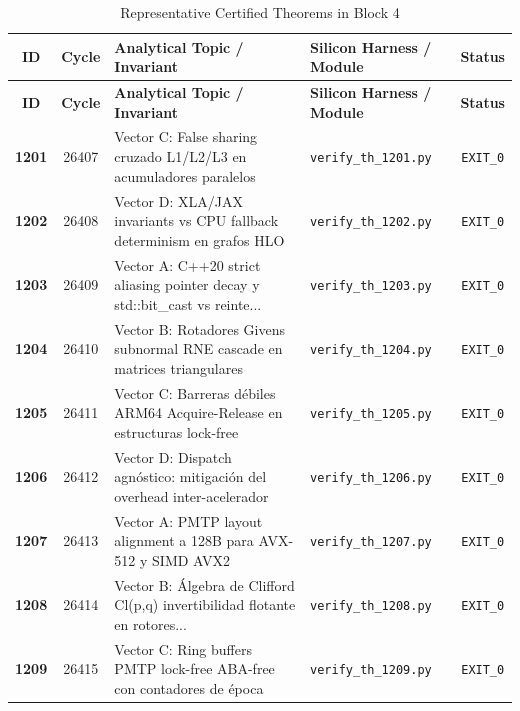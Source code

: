 \documentclass[journal,10pt,compsoc]{IEEEtran}
\theoremstyle{plain}
\theoremstyle{definition}
\begin{document}
\begin{center}
\small
\begin{longtable}{ccp{6.8cm}p{5.2cm}c}
\caption{Representative Certified Theorems in Block 4} \label{tab:theorems_block_4} \\
\toprule
\textbf{ID} & \textbf{Cycle} & \textbf{Analytical Topic / Invariant} & \textbf{Silicon Harness / Module} & \textbf{Status} \\
\midrule
\endfirsthead
\toprule
\textbf{ID} & \textbf{Cycle} & \textbf{Analytical Topic / Invariant} & \textbf{Silicon Harness / Module} & \textbf{Status} \\
\midrule
\endhead
\bottomrule
\endfoot
\textbf{1201} & 26407 & Vector C: False sharing cruzado L1/L2/L3 en acumuladores paralelos \label{thm:polydim_1201} & \texttt{verify\_th\_1201.py} & \texttt{EXIT\_0} \\
\textbf{1202} & 26408 & Vector D: XLA/JAX invariants vs CPU fallback determinism en grafos HLO \label{thm:polydim_1202} & \texttt{verify\_th\_1202.py} & \texttt{EXIT\_0} \\
\textbf{1203} & 26409 & Vector A: C++20 strict aliasing pointer decay y std::bit\_cast vs reinte... \label{thm:polydim_1203} & \texttt{verify\_th\_1203.py} & \texttt{EXIT\_0} \\
\textbf{1204} & 26410 & Vector B: Rotadores Givens subnormal RNE cascade en matrices triangulares \label{thm:polydim_1204} & \texttt{verify\_th\_1204.py} & \texttt{EXIT\_0} \\
\textbf{1205} & 26411 & Vector C: Barreras débiles ARM64 Acquire-Release en estructuras lock-free \label{thm:polydim_1205} & \texttt{verify\_th\_1205.py} & \texttt{EXIT\_0} \\
\textbf{1206} & 26412 & Vector D: Dispatch agnóstico: mitigación del overhead inter-acelerador \label{thm:polydim_1206} & \texttt{verify\_th\_1206.py} & \texttt{EXIT\_0} \\
\textbf{1207} & 26413 & Vector A: PMTP layout alignment a 128B para AVX-512 y SIMD AVX2 \label{thm:polydim_1207} & \texttt{verify\_th\_1207.py} & \texttt{EXIT\_0} \\
\textbf{1208} & 26414 & Vector B: Álgebra de Clifford Cl(p,q) invertibilidad flotante en rotores... \label{thm:polydim_1208} & \texttt{verify\_th\_1208.py} & \texttt{EXIT\_0} \\
\textbf{1209} & 26415 & Vector C: Ring buffers PMTP lock-free ABA-free con contadores de época \label{thm:polydim_1209} & \texttt{verify\_th\_1209.py} & \texttt{EXIT\_0} \\

\end{longtable}
\end{center}
\end{document}
